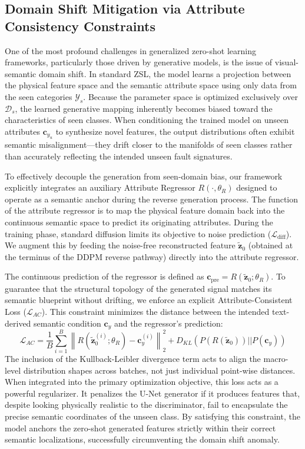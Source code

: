 \subsection{Domain Shift Mitigation via Attribute Consistency Constraints}
\label{subsec:domain_shift}
One of the most profound challenges in generalized zero-shot learning frameworks, particularly those driven by generative models, is the issue of visual-semantic domain shift. In standard ZSL, the model learns a projection between the physical feature space and the semantic attribute space using only data from the seen categories $\mathcal{Y}_s$. Because the parameter space is optimized exclusively over $\mathcal{D}_s$, the learned generative mapping inherently becomes biased toward the characteristics of seen classes. When conditioning the trained model on unseen attributes $\mathbf{c}_{y_u}$ to synthesize novel features, the output distributions often exhibit semantic misalignment---they drift closer to the manifolds of seen classes rather than accurately reflecting the intended unseen fault signatures.

To effectively decouple the generation from seen-domain bias, our framework explicitly integrates an auxiliary Attribute Regressor $R(\cdot, \theta_R)$ designed to operate as a semantic anchor during the reverse generation process. The function of the attribute regressor is to map the physical feature domain back into the continuous semantic space to predict its originating attributes. During the training phase, standard diffusion limits its objective to noise prediction ($\mathcal{L}_{\text{diff}}$). We augment this by feeding the noise-free reconstructed feature $\tilde{\mathbf{z}}_0$ (obtained at the terminus of the DDPM reverse pathway) directly into the attribute regressor.

The continuous prediction of the regressor is defined as $\mathbf{c}_{\text{pre}} = R(\tilde{\mathbf{z}}_0; \theta_R)$. To guarantee that the structural topology of the generated signal matches its semantic blueprint without drifting, we enforce an explicit Attribute-Consistent Loss ($\mathcal{L}_{AC}$). This constraint minimizes the distance between the intended text-derived semantic condition $\mathbf{c}_y$ and the regressor's prediction:
\begin{equation}
\mathcal{L}_{AC} = \frac{1}{B} \sum_{i=1}^{B} \left\| R(\tilde{\mathbf{z}}_{0}^{(i)}; \theta_R) - \mathbf{c}_{y}^{(i)} \right\|_2^2 + D_{KL}(P(R(\tilde{\mathbf{z}}_0)) || P(\mathbf{c}_y))
\end{equation}
The inclusion of the Kullback-Leibler divergence term acts to align the macro-level distribution shapes across batches, not just individual point-wise distances. When integrated into the primary optimization objective, this loss acts as a powerful regularizer. It penalizes the U-Net generator if it produces features that, despite looking physically realistic to the discriminator, fail to encapsulate the precise semantic coordinates of the unseen class. By satisfying this constraint, the model anchors the zero-shot generated features strictly within their correct semantic localizations, successfully circumventing the domain shift anomaly.

